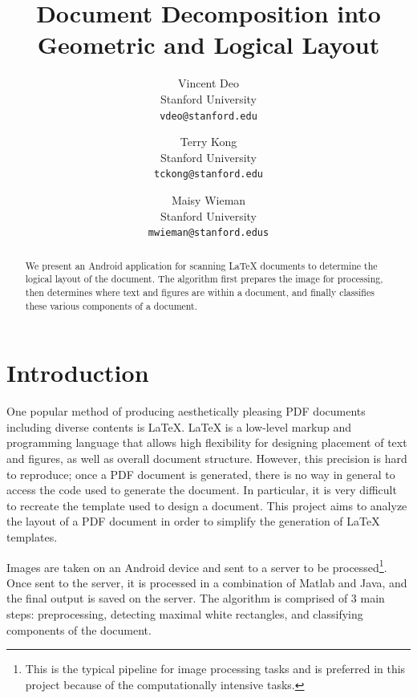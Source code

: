 \documentclass{report}
\begin{document}
\title{Document Decomposition into Geometric and Logical Layout}
\date{}
\author{
  Vincent Deo\\
  Stanford University\\
  \texttt{vdeo@stanford.edu}
  \and
  Terry Kong\\
  Stanford University\\
  \texttt{tckong@stanford.edu}
  \and
  Maisy Wieman\\
  Stanford University\\
  \texttt{mwieman@stanford.edus}
}

\maketitle

\begin{abstract}
We present an Android application for scanning LaTeX documents to determine the logical layout of the document. The algorithm first prepares the image for processing, then determines where text and figures are within a document, and finally classifies these various components of a document. 
\end{abstract}

\chapter{Introduction}
One popular method of producing aesthetically pleasing PDF documents including diverse contents is LaTeX. LaTeX is a low-level markup and programming language that allows high flexibility for designing placement of text and figures, as well as overall document structure. However, this precision is hard to reproduce; once a PDF document is generated, there is no way in general to access the code used to generate the document. In particular, it is very difficult to recreate the template used to design a document. This project aims to analyze the layout of a PDF document in order to simplify the generation of LaTeX templates. 

Images are taken on an Android device and sent to a server to be processed\footnote{This is the typical pipeline for image processing tasks and is preferred in this project because of the computationally intensive tasks.}. Once sent to the server, it is processed in a combination of Matlab and Java, and the final output is saved on the server. The algorithm is comprised of 3 main steps: preprocessing, detecting maximal white rectangles, and classifying components of the document. 
\end{document}
